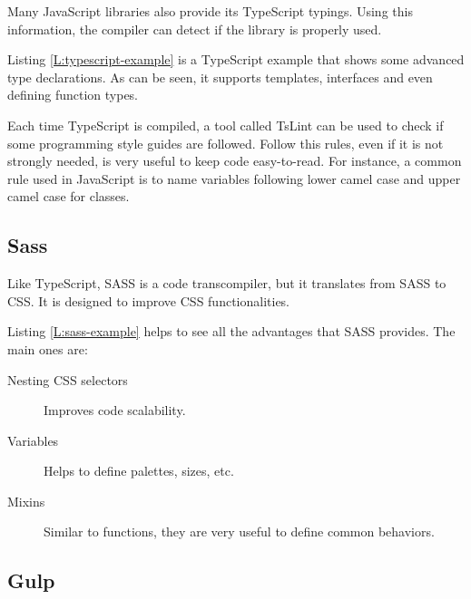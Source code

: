 Many JavaScript libraries also provide its TypeScript typings. Using this 
information, the compiler can detect if the library is properly used.

\begin{codefigure}
\end{codefigure}

Listing \ref{L:typescript-example} is a TypeScript example that shows some
advanced type declarations. As can be seen, it supports templates, interfaces
and even defining function types.

Each time TypeScript is compiled, a tool called TsLint can be used to check if 
some programming style guides are followed. Follow this rules, even if it is 
not strongly needed, is very useful to keep code easy-to-read. For instance, 
a common rule used in JavaScript is to name variables following lower camel case
and upper camel case for classes.

\subsection{Sass}

Like TypeScript, SASS is a code transcompiler, but it translates from SASS to
CSS. It is designed to improve CSS functionalities.

\begin{codefigure}
\end{codefigure}

Listing \ref{L:sass-example} helps to see all the advantages that SASS provides.
The main ones are:

\begin{description}
	\item[Nesting CSS selectors]
	Improves code scalability. 

	\item[Variables]
	Helps to define palettes, sizes, etc.
	
	\item[Mixins]
	Similar to functions, they are very useful to define common behaviors.
	
\end{description}

\subsection{Gulp}

